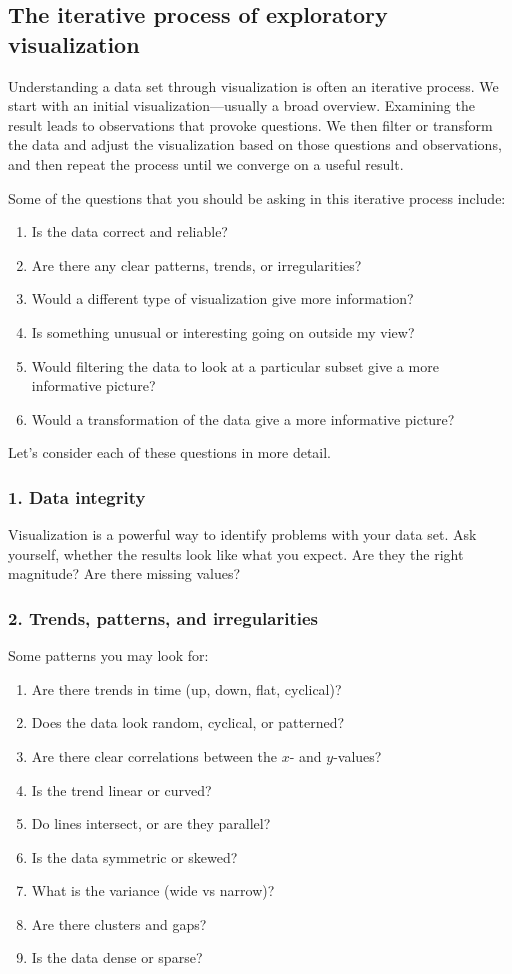 \subsection*{The iterative process of exploratory visualization} 

Understanding a data set through visualization is often an iterative process. We start with an initial visualization---usually a broad overview.  Examining the result leads to observations that provoke questions.  We then filter or transform the data and adjust the visualization based on those questions and observations, and then repeat the process until we converge on a useful result.

Some of the questions that you should be asking in this iterative process include:
\begin{enumerate}
\item Is the data correct and reliable? 
\item Are there any clear patterns, trends, or irregularities?
\item Would a different type of visualization give more information?
\item Is something unusual or interesting going on outside my view?
\item Would filtering the data to look at a particular subset give a more informative picture?
\item Would a transformation of the data give a more informative picture?
\end{enumerate}
Let's consider each of these questions in more detail.

\subsubsection*{1. Data integrity}

Visualization is a powerful way to identify problems with your data set.  Ask yourself, whether the results look like what you expect.  Are they the right magnitude? Are there missing values? 

\subsubsection*{2. Trends, patterns, and irregularities}

Some patterns you may look for:
\begin{enumerate}
\item Are there trends in time (up, down, flat, cyclical)?
\item Does the data look random, cyclical, or patterned?
\item Are there clear correlations between the $x$- and $y$-values? 
\item Is the trend linear or curved?
\item Do lines intersect, or are they parallel?
\item Is the data symmetric or skewed?
\item What is the variance (wide vs narrow)?
\item Are there clusters and gaps?
\item Is the data dense or sparse?
\end{enumerate}

